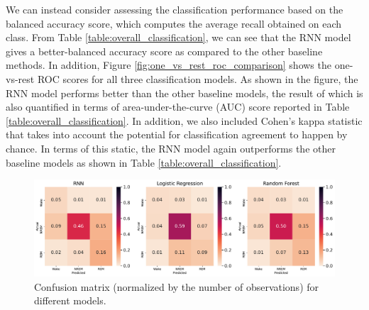 \documentclass[12pt]{article}
\begin{document}
We can instead consider assessing the classification performance based on the balanced accuracy score, which computes the average recall obtained on each class. From Table \ref{table:overall_classification}, we can see that the RNN model gives a better-balanced accuracy score as compared to the other baseline methods. In addition, Figure \ref{fig:one_vs_rest_roc_comparison} shows the one-vs-rest ROC scores for all three classification models. As shown in the figure, the RNN model performs better than the other baseline models, the result of which is also quantified in terms of area-under-the-curve (AUC) score reported in Table \ref{table:overall_classification}. In addition, we also included Cohen's kappa statistic \citep{cohen1960coefficient} that takes into account the potential for classification agreement to happen by chance. In terms of this static, the RNN model again outperforms the other baseline models as shown in Table \ref{table:overall_classification}. 


\begin{table}[t]
\centering
\caption{Classification metrics for test subjects. The best values bolded. ($\uparrow$): higher is better, ($\downarrow$) lower is better}
\label{table:overall_classification}
\end{table}


\begin{figure}
\centering
\includegraphics[width=\textwidth]{figures/confusion_matrix.pdf}
\caption{Confusion matrix (normalized by the number of observations) for different models.}
\label{fig:confusion_matrix}
\end{figure}
\end{document}
